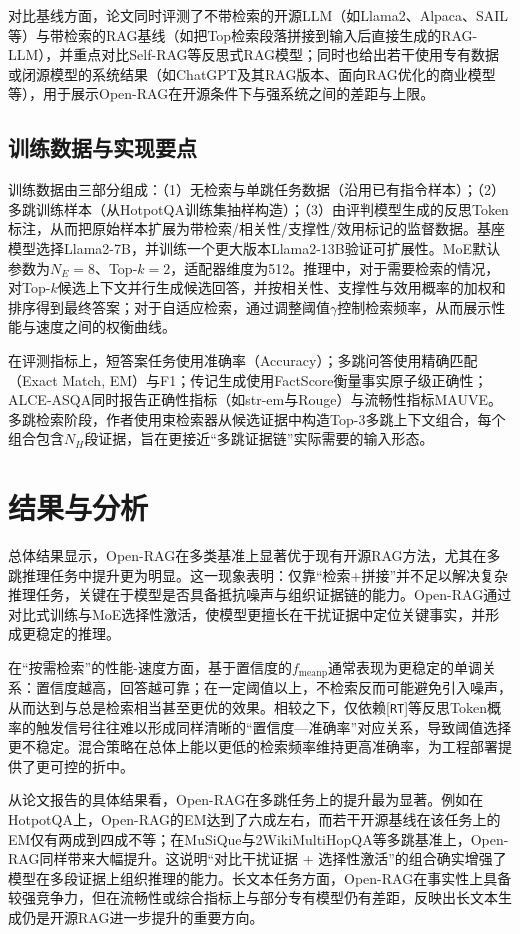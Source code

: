 对比基线方面，论文同时评测了不带检索的开源LLM（如Llama2、Alpaca、SAIL等）与带检索的RAG基线（如把Top检索段落拼接到输入后直接生成的RAG-LLM），并重点对比Self-RAG等反思式RAG模型；同时也给出若干使用专有数据或闭源模型的系统结果（如ChatGPT及其RAG版本、面向RAG优化的商业模型等），用于展示Open-RAG在开源条件下与强系统之间的差距与上限。
 
\subsection{训练数据与实现要点}
训练数据由三部分组成：（1）无检索与单跳任务数据（沿用已有指令样本）；（2）多跳训练样本（从HotpotQA训练集抽样构造）；（3）由评判模型生成的反思Token标注，从而把原始样本扩展为带检索/相关性/支撑性/效用标记的监督数据。基座模型选择Llama2-7B，并训练一个更大版本Llama2-13B验证可扩展性。MoE默认参数为$N_E=8$、Top-$k=2$，适配器维度为512。推理中，对于需要检索的情况，对Top-$k$候选上下文并行生成候选回答，并按相关性、支撑性与效用概率的加权和排序得到最终答案；对于自适应检索，通过调整阈值$\gamma$控制检索频率，从而展示性能与速度之间的权衡曲线。

在评测指标上，短答案任务使用准确率（Accuracy）；多跳问答使用精确匹配（Exact Match, EM）与F1；传记生成使用FactScore衡量事实原子级正确性；ALCE-ASQA同时报告正确性指标（如str-em与Rouge）与流畅性指标MAUVE。多跳检索阶段，作者使用束检索器从候选证据中构造Top-3多跳上下文组合，每个组合包含$N_H$段证据，旨在更接近“多跳证据链”实际需要的输入形态。
 
\section{结果与分析}
总体结果显示，Open-RAG在多类基准上显著优于现有开源RAG方法，尤其在多跳推理任务中提升更为明显。这一现象表明：仅靠“检索+拼接”并不足以解决复杂推理任务，关键在于模型是否具备抵抗噪声与组织证据链的能力。Open-RAG通过对比式训练与MoE选择性激活，使模型更擅长在干扰证据中定位关键事实，并形成更稳定的推理。
 
在“按需检索”的性能-速度方面，基于置信度的$f_{\mathrm{meanp}}$通常表现为更稳定的单调关系：置信度越高，回答越可靠；在一定阈值以上，不检索反而可能避免引入噪声，从而达到与总是检索相当甚至更优的效果。相较之下，仅依赖[\texttt{RT}]等反思Token概率的触发信号往往难以形成同样清晰的“置信度—准确率”对应关系，导致阈值选择更不稳定。混合策略在总体上能以更低的检索频率维持更高准确率，为工程部署提供了更可控的折中。

从论文报告的具体结果看，Open-RAG在多跳任务上的提升最为显著。例如在HotpotQA上，Open-RAG的EM达到了六成左右，而若干开源基线在该任务上的EM仅有两成到四成不等；在MuSiQue与2WikiMultiHopQA等多跳基准上，Open-RAG同样带来大幅提升。这说明“对比干扰证据 + 选择性激活”的组合确实增强了模型在多段证据上组织推理的能力。长文本任务方面，Open-RAG在事实性上具备较强竞争力，但在流畅性或综合指标上与部分专有模型仍有差距，反映出长文本生成仍是开源RAG进一步提升的重要方向。

